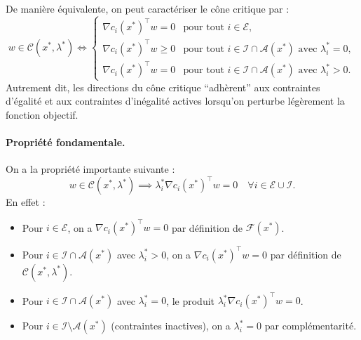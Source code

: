 \begin{remarque}
    De manière équivalente, on peut caractériser le cône critique par :
    \begin{equation}
        w \in \mathcal{C}(x^*, \lambda^*) \iff 
        \begin{cases}
            \nabla c_i(x^*)^\top w = 0 & \text{pour tout } i \in \mathcal{E}, \\
            \nabla c_i(x^*)^\top w \geq 0 & \text{pour tout } i \in \mathcal{I} \cap \mathcal{A}(x^*) \text{ avec } \lambda_i^* = 0, \\
            \nabla c_i(x^*)^\top w = 0 & \text{pour tout } i \in \mathcal{I} \cap \mathcal{A}(x^*) \text{ avec } \lambda_i^* > 0.
        \end{cases}
    \end{equation}
    Autrement dit, les directions du cône critique ``adhèrent'' aux contraintes d'égalité et aux contraintes d'inégalité actives lorsqu'on perturbe légèrement la fonction objectif.
    
    \paragraph{Propriété fondamentale.}
    On a la propriété importante suivante :
    \begin{equation}
        w \in \mathcal{C}(x^*, \lambda^*) \implies \lambda_i^* \nabla c_i(x^*)^\top w = 0 \quad \forall i \in \mathcal{E} \cup \mathcal{I}.
    \end{equation}
    En effet :
    \begin{itemize}
        \item Pour $i \in \mathcal{E}$, on a $\nabla c_i(x^*)^\top w = 0$ par définition de $\mathcal{F}(x^*)$.
        \item Pour $i \in \mathcal{I} \cap \mathcal{A}(x^*)$ avec $\lambda_i^* > 0$, on a $\nabla c_i(x^*)^\top w = 0$ par définition de $\mathcal{C}(x^*, \lambda^*)$.
        \item Pour $i \in \mathcal{I} \cap \mathcal{A}(x^*)$ avec $\lambda_i^* = 0$, le produit $\lambda_i^* \nabla c_i(x^*)^\top w = 0$.
        \item Pour $i \in \mathcal{I} \setminus \mathcal{A}(x^*)$ (contraintes inactives), on a $\lambda_i^* = 0$ par complémentarité.
    \end{itemize}
    

\end{remarque}
